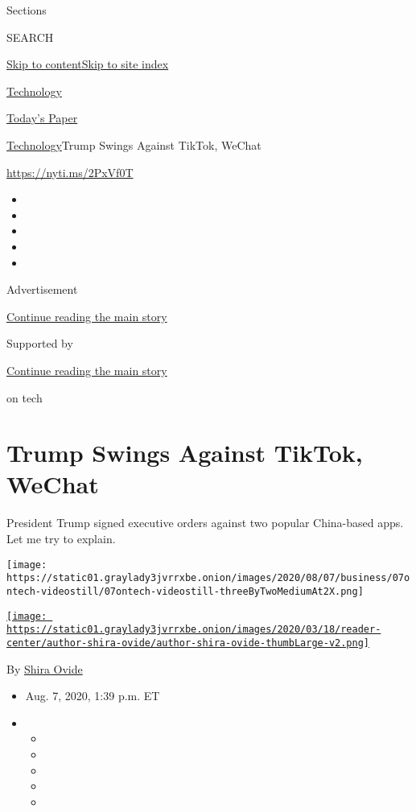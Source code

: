 Sections

SEARCH

\protect\hyperlink{site-content}{Skip to
content}\protect\hyperlink{site-index}{Skip to site index}

\href{https://www.nytimes3xbfgragh.onion/section/technology}{Technology}

\href{https://myaccount.nytimes3xbfgragh.onion/auth/login?response_type=cookie\&client_id=vi}{}

\href{https://www.nytimes3xbfgragh.onion/section/todayspaper}{Today's
Paper}

\href{/section/technology}{Technology}\textbar{}Trump Swings Against
TikTok, WeChat

\url{https://nyti.ms/2PxVf0T}

\begin{itemize}
\item
\item
\item
\item
\item
\end{itemize}

Advertisement

\protect\hyperlink{after-top}{Continue reading the main story}

Supported by

\protect\hyperlink{after-sponsor}{Continue reading the main story}

on tech

\hypertarget{trump-swings-against-tiktok-wechat}{%
\section{Trump Swings Against TikTok,
WeChat}\label{trump-swings-against-tiktok-wechat}}

President Trump signed executive orders against two popular China-based
apps. Let me try to explain.

\texttt{[image: https://static01.graylady3jvrrxbe.onion/images/2020/08/07/business/07ontech-videostill/07ontech-videostill-threeByTwoMediumAt2X.png]}

\href{https://www.nytimes3xbfgragh.onion/by/shira-ovide}{\texttt{[image: https://static01.graylady3jvrrxbe.onion/images/2020/03/18/reader-center/author-shira-ovide/author-shira-ovide-thumbLarge-v2.png]}}

By \href{https://www.nytimes3xbfgragh.onion/by/shira-ovide}{Shira Ovide}

\begin{itemize}
\item
  Aug. 7, 2020, 1:39 p.m. ET
\item
  \begin{itemize}
  \item
  \item
  \item
  \item
  \item
  \end{itemize}
\end{itemize}

